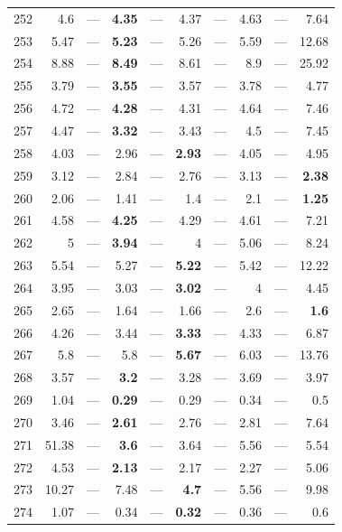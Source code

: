 \begin{longtable}{lr@{\hskip 4pt}l@{\hskip 12pt}r@{\hskip 4pt}l@{\hskip 12pt}r@{\hskip 4pt}l@{\hskip 12pt}r@{\hskip 4pt}l@{\hskip 12pt}r}
252 & 4.6 & --- & \textbf{4.35} & --- & 4.37 & --- & 4.63 & --- & 7.64 \\
253 & 5.47 & --- & \textbf{5.23} & --- & 5.26 & --- & 5.59 & --- & 12.68 \\
254 & 8.88 & --- & \textbf{8.49} & --- & 8.61 & --- & 8.9 & --- & 25.92 \\
255 & 3.79 & --- & \textbf{3.55} & --- & 3.57 & --- & 3.78 & --- & 4.77 \\
256 & 4.72 & --- & \textbf{4.28} & --- & 4.31 & --- & 4.64 & --- & 7.46 \\
257 & 4.47 & --- & \textbf{3.32} & --- & 3.43 & --- & 4.5 & --- & 7.45 \\
258 & 4.03 & --- & 2.96 & --- & \textbf{2.93} & --- & 4.05 & --- & 4.95 \\
259 & 3.12 & --- & 2.84 & --- & 2.76 & --- & 3.13 & --- & \textbf{2.38} \\
260 & 2.06 & --- & 1.41 & --- & 1.4 & --- & 2.1 & --- & \textbf{1.25} \\
261 & 4.58 & --- & \textbf{4.25} & --- & 4.29 & --- & 4.61 & --- & 7.21 \\
262 & 5 & --- & \textbf{3.94} & --- & 4 & --- & 5.06 & --- & 8.24 \\
263 & 5.54 & --- & 5.27 & --- & \textbf{5.22} & --- & 5.42 & --- & 12.22 \\
264 & 3.95 & --- & 3.03 & --- & \textbf{3.02} & --- & 4 & --- & 4.45 \\
265 & 2.65 & --- & 1.64 & --- & 1.66 & --- & 2.6 & --- & \textbf{1.6} \\
266 & 4.26 & --- & 3.44 & --- & \textbf{3.33} & --- & 4.33 & --- & 6.87 \\
267 & 5.8 & --- & 5.8 & --- & \textbf{5.67} & --- & 6.03 & --- & 13.76 \\
268 & 3.57 & --- & \textbf{3.2} & --- & 3.28 & --- & 3.69 & --- & 3.97 \\
269 & 1.04 & --- & \textbf{0.29} & --- & 0.29 & --- & 0.34 & --- & 0.5 \\
270 & 3.46 & --- & \textbf{2.61} & --- & 2.76 & --- & 2.81 & --- & 7.64 \\
271 & 51.38 & --- & \textbf{3.6} & --- & 3.64 & --- & 5.56 & --- & 5.54 \\
272 & 4.53 & --- & \textbf{2.13} & --- & 2.17 & --- & 2.27 & --- & 5.06 \\
273 & 10.27 & --- & 7.48 & --- & \textbf{4.7} & --- & 5.56 & --- & 9.98 \\
274 & 1.07 & --- & 0.34 & --- & \textbf{0.32} & --- & 0.36 & --- & 0.6 \\

\end{longtable}
